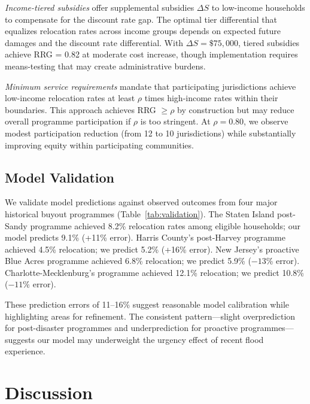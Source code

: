 \documentclass[12pt,a4paper]{article}
\begin{document}
\textit{Income-tiered subsidies} offer supplemental subsidies $\Delta S$ to low-income households to compensate for the discount rate gap. The optimal tier differential that equalizes relocation rates across income groups depends on expected future damages and the discount rate differential. With $\Delta S = \$75,000$, tiered subsidies achieve RRG = 0.82 at moderate cost increase, though implementation requires means-testing that may create administrative burdens.

\textit{Minimum service requirements} mandate that participating jurisdictions achieve low-income relocation rates at least $\rho$ times high-income rates within their boundaries. This approach achieves RRG $\geq \rho$ by construction but may reduce overall programme participation if $\rho$ is too stringent. At $\rho = 0.80$, we observe modest participation reduction (from 12 to 10 jurisdictions) while substantially improving equity within participating communities.

\subsection{Model Validation}

We validate model predictions against observed outcomes from four major historical buyout programmes (Table~\ref{tab:validation}). The Staten Island post-Sandy programme achieved 8.2\% relocation rates among eligible households; our model predicts 9.1\% (+11\% error). Harris County's post-Harvey programme achieved 4.5\% relocation; we predict 5.2\% (+16\% error). New Jersey's proactive Blue Acres programme achieved 6.8\% relocation; we predict 5.9\% ($-13$\% error). Charlotte-Mecklenburg's programme achieved 12.1\% relocation; we predict 10.8\% ($-11$\% error).

These prediction errors of 11--16\% suggest reasonable model calibration while highlighting areas for refinement. The consistent pattern---slight overprediction for post-disaster programmes and underprediction for proactive programmes---suggests our model may underweight the urgency effect of recent flood experience.


\section{Discussion}\label{sec:discussion}
\end{document}
